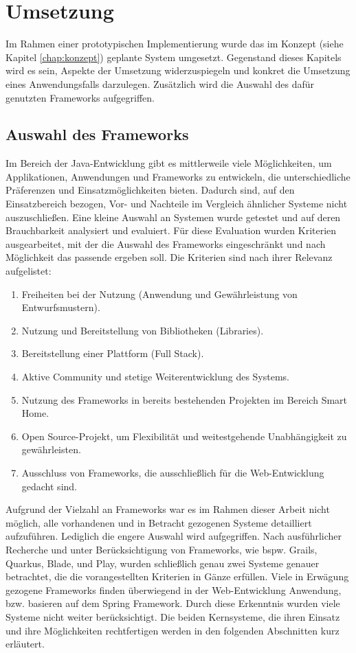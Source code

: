 \chapter{Umsetzung}
\label{chap:umsetzung}
    Im Rahmen einer prototypischen Implementierung wurde das im Konzept (siehe Kapitel \ref{chap:konzept}) geplante System
    umgesetzt. Gegenstand dieses Kapitels wird es sein, Aspekte der Umsetzung widerzuspiegeln und konkret die Umsetzung eines  
    Anwendungsfalls darzulegen. Zusätzlich wird die Auswahl des dafür genutzten Frameworks aufgegriffen. 

\section{Auswahl des Frameworks}
\label{sec:frameworkauswahl}
    Im Bereich der Java-Entwicklung gibt es mittlerweile viele Möglichkeiten, um Applikationen, Anwendungen und Frameworks 
    zu entwickeln, die unterschiedliche Präferenzen und Einsatzmöglichkeiten bieten. Dadurch sind, auf den Einsatzbereich bezogen, 
    Vor- und Nachteile im Vergleich ähnlicher Systeme nicht auszuschließen. Eine kleine Auswahl an Systemen wurde getestet und auf deren 
    Brauchbarkeit analysiert und evaluiert. Für diese Evaluation wurden Kriterien ausgearbeitet, mit der die Auswahl des Frameworks 
    eingeschränkt und nach Möglichkeit das passende ergeben soll. Die Kriterien sind nach ihrer Relevanz aufgelistet: 
    \begin{enumerate}
        \item Freiheiten bei der Nutzung (Anwendung und Gewährleistung von Entwurfsmustern).
        \item Nutzung und Bereitstellung von Bibliotheken (Libraries).
        \item Bereitstellung einer Plattform (Full Stack).
        \item Aktive Community und stetige Weiterentwicklung des Systems.
        \item Nutzung des Frameworks in bereits bestehenden Projekten im Bereich Smart Home.
        \item Open Source-Projekt, um Flexibilität und weitestgehende Unabhängigkeit zu gewährleisten.
        \item Ausschluss von Frameworks, die ausschließlich für die Web-Entwicklung gedacht sind.
    \end{enumerate}  
    Aufgrund der Vielzahl an Frameworks war es im Rahmen dieser Arbeit nicht möglich, alle vorhandenen und in Betracht 
    gezogenen Systeme detailliert aufzuführen. Lediglich die engere Auswahl wird aufgegriffen. 
    Nach ausführlicher Recherche und unter Berücksichtigung von Frameworks, wie bspw. Grails, Quarkus, Blade, und Play, wurden 
    schließlich genau zwei Systeme genauer betrachtet, die die vorangestellten Kriterien in Gänze erfüllen. Viele in Erwägung gezogene Frameworks 
    finden überwiegend in der Web-Entwicklung Anwendung, bzw. basieren auf dem Spring Framework. Durch diese Erkenntnis wurden 
    viele Systeme nicht weiter berücksichtigt. Die beiden Kernsysteme, die ihren Einsatz und ihre Möglichkeiten rechtfertigen
    werden in den folgenden Abschnitten kurz erläutert.

